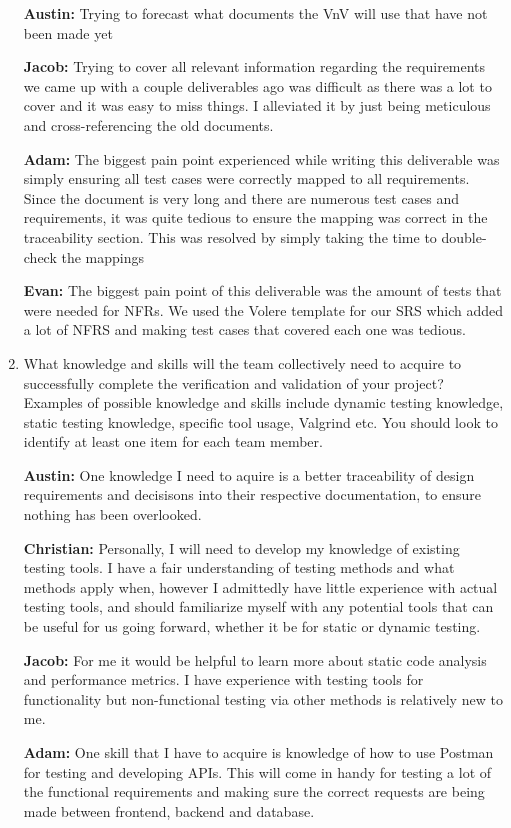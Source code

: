 \documentclass[12pt, titlepage]{article}
\begin{document}
\begin{enumerate}
  \textbf{Austin:} Trying to forecast what documents the VnV will use that have not been made yet
  
  \textbf{Jacob:} Trying to cover all relevant information regarding the requirements we came up with a couple deliverables ago was difficult as there was a lot to cover and it was easy to miss things. I alleviated it by just being meticulous and cross-referencing the old documents.

  \textbf{Adam:} The biggest pain point experienced while writing this deliverable was simply ensuring all test cases were correctly mapped to all requirements. Since the document is very long and there are numerous test cases and requirements, it was quite tedious to ensure the mapping was correct in the traceability section. This was resolved by simply taking the time to double-check the mappings

  \textbf{Evan: } The biggest pain point of this deliverable was the amount of tests that were needed for NFRs. We used the Volere template for our SRS which added a lot of NFRS and making test cases that covered each one was tedious.
  
  \item What knowledge and skills will the team collectively need to acquire to
  successfully complete the verification and validation of your project?
  Examples of possible knowledge and skills include dynamic testing knowledge,
  static testing knowledge, specific tool usage, Valgrind etc.  You should look to
  identify at least one item for each team member.

  \textbf{Austin:} One knowledge I need to aquire is a better traceability of design requirements and decisisons into their respective documentation, to ensure nothing has been overlooked.
  
  \textbf{Christian:} Personally, I will need to develop my knowledge of existing testing tools. I have a fair understanding of testing methods and what methods apply when, however I admittedly have little experience with actual testing tools, and should familiarize myself with any potential tools that can be useful for us going forward, whether it be for static or dynamic testing.
  
  \textbf{Jacob:} For me it would be helpful to learn more about static code analysis and performance metrics. I have experience with testing tools for functionality but non-functional testing via other methods is relatively new to me.

  \textbf{Adam:} One skill that I have to acquire is knowledge of how to use Postman for testing and developing APIs. This will come in handy for testing a lot of the functional requirements and making sure the correct requests are being made between frontend, backend and database.


\end{enumerate}
\end{document}
